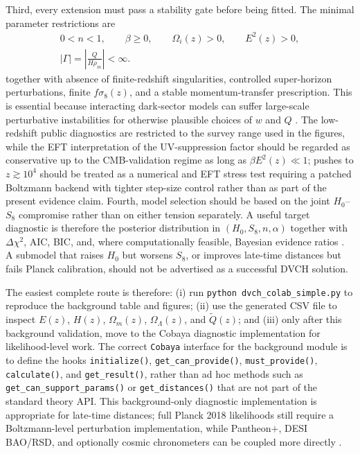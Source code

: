 \documentclass[pdflatex,sn-mathphys-num]{sn-jnl}%
\begin{document}
Third, every extension must pass a stability gate before being fitted. The
minimal parameter restrictions are
\begin{equation}
\begin{gathered}
0<n<1,
\qquad \beta\ge0,
\qquad \Omega_i(z)>0,
\qquad E^2(z)>0,\\
\left|\Gamma\right|=\left|\frac{Q}{H\rho_m}\right|<\infty .
\end{gathered}
\label{eq:dvch_stability_gate}
\end{equation}
together with absence of finite-redshift singularities, controlled
super-horizon perturbations, finite $f\sigma_8(z)$, and a stable
momentum-transfer prescription. This is essential because interacting
dark-sector models can suffer large-scale perturbative instabilities for
otherwise plausible choices of $w$ and $Q$ \cite{Valiviita:2008iv}. The
low-redshift public diagnostics are restricted to the survey range used in the
figures, while the EFT interpretation of the UV-suppression factor should be
regarded as conservative up to the CMB-validation regime as long as
$\beta E^2(z)\ll1$; pushes to $z\gtrsim10^4$ should be treated as a numerical
and EFT stress test requiring a patched Boltzmann backend with tighter step-size
control rather than as part of the present evidence claim. Fourth, model
selection should be based
on the joint $H_0$--$S_8$ compromise rather than on either tension separately.
A useful target diagnostic is therefore the posterior distribution in
$(H_0,S_8,n,\alpha)$ together with $\Delta\chi^2$, AIC, BIC, and, where
computationally feasible, Bayesian evidence ratios \cite{Jeffreys:1961}. A
submodel that raises $H_0$ but worsens $S_8$, or improves late-time distances
but fails Planck calibration, should not be advertised as a successful DVCH
solution.

The easiest complete route is therefore: (i) run
\texttt{python dvch\_colab\_simple.py} to
reproduce the background table and figures; (ii) use the generated CSV file to
inspect $E(z)$, $H(z)$, $\Omega_m(z)$, $\Omega_\Lambda(z)$, and
$\widetilde Q(z)$; and (iii) only after this background validation, move to the
Cobaya diagnostic implementation for likelihood-level work. The correct \texttt{Cobaya}
interface for the background module is to define the hooks
\texttt{initialize()}, \texttt{get\_can\_provide()},
\texttt{must\_provide()}, \texttt{calculate()}, and
\texttt{get\_result()}, rather than ad hoc methods such as
\texttt{get\_can\_support\_params()} or \texttt{get\_distances()} that are
not part of the standard theory API. This background-only diagnostic implementation is
appropriate for late-time distances; full Planck 2018 likelihoods still require
a Boltzmann-level perturbation implementation, while Pantheon$+$, DESI BAO/RSD,
and optionally cosmic chronometers can be coupled more directly
\cite{Adame:2024ywp}.
\end{document}

